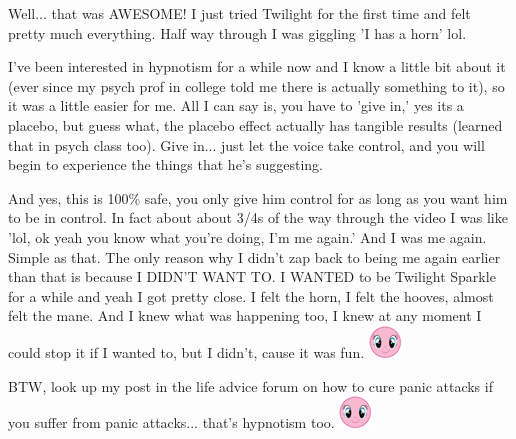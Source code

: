 \documentclass[ebook,12pt,oneside,openany]{memoir}
\begin{document}
\begin{tcolorbox}[title=Two-of-Hearts]
\par{Well... that was AWESOME! I just tried Twilight for the first time and felt pretty much everything. Half way through I was giggling 'I has a horn' lol.}
\newline{}
\par{I've been interested in hypnotism for a while now and I know a little bit about it (ever since my psych prof in college told me there is actually something to it), so it was a little easier for me. All I can say is, you have to 'give in,' yes its a placebo, but guess what, the placebo effect actually has tangible results (learned that in psych class too). Give in... just let the voice take control, and you will begin to experience the things that he's suggesting.}
\newline{}
\par{And yes, this is 100\% safe, you only give him control for as long as you want him to be in control. In fact about about 3/4s of the way through the video I was like 'lol, ok yeah you know what you're doing, I'm me again.' And I was me again. Simple as that. The only reason why I didn't zap back to being me again earlier than that is because I DIDN'T WANT TO. I WANTED to be Twilight Sparkle for a while and yeah I got pretty close. I felt the horn, I felt the hooves, almost felt the mane. And I knew what was happening too, I knew at any moment I could stop it if I wanted to, but I didn't, cause it was fun. \includegraphics{images/mlp_smile.png}}
\newline{}
\par{BTW, look up my post in the life advice forum on how to cure panic attacks if you suffer from panic attacks... that's hypnotism too. \includegraphics{images/mlp_smile.png}}
\end{tcolorbox}
\end{document}
